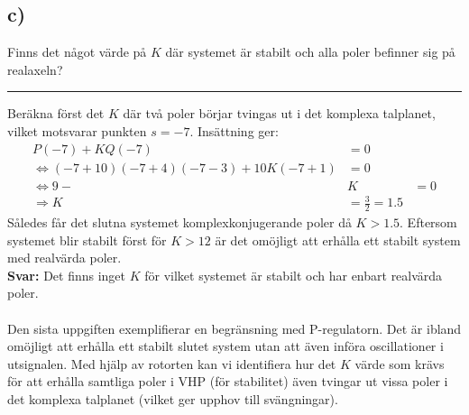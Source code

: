 \documentclass[12pt]{article}
\newcommand{\qline}{\hrule \vspace*{10pt}}
\begin{document}
\subsection*{c)}
Finns det något värde på $K$ där systemet är stabilt och alla poler befinner sig på realaxeln?\vspace*{2pt}
\qline
Beräkna först det $K$ där två poler börjar tvingas ut i det komplexa talplanet, vilket motsvarar punkten $s = -7$. Insättning ger:
\begin{align*}
  P(-7) + KQ(-7) &= 0 \\
  \Leftrightarrow (-7+10)(-7+4)(-7-3) + 10K(-7+1) &= 0 \\
  \Leftrightarrow 9-&K &= 0 \\
  \Rightarrow K &= \frac{3}{2} = 1.5
\end{align*}
Således får det slutna systemet komplexkonjugerande poler då $K > 1.5$. Eftersom systemet blir stabilt först för $K > 12$ är det omöjligt att erhålla ett stabilt system med realvärda poler.\\
\textbf{Svar:} Det finns inget $K$ för vilket systemet är stabilt och har enbart realvärda poler. \\\\
Den sista uppgiften exemplifierar en begränsning med P-regulatorn. Det är ibland omöjligt att erhålla ett stabilt slutet system utan att även införa oscillationer i utsignalen. Med hjälp av rotorten kan vi identifiera hur det $K$ värde som krävs för att erhålla samtliga poler i VHP (för stabilitet) även tvingar ut vissa poler i det komplexa talplanet (vilket ger upphov till svängningar).
\end{document}

